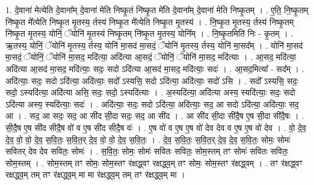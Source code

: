 \documentclass[17pt]{extarticle}
\begin{document}
1. दे॒वाना॑ मेत्येति दे॒वाना᳚म् दे॒वाना॑ मेति निष्कृ॒तं नि॑ष्कृ॒त मे॑ति दे॒वाना᳚म् दे॒वाना॑ मेति निष्कृ॒तम् । . ए॒ति॒ नि॒ष्कृ॒तम् नि॑ष्कृ॒त मे᳚त्येति निष्कृ॒त मृ॒तस्य॒ र्तस्य॑ निष्कृ॒त मे᳚त्येति निष्कृ॒त मृ॒तस्य॑ । . नि॒ष्कृ॒त मृ॒तस्य॒ र्तस्य॑ निष्कृ॒तम् नि॑ष्कृ॒त मृ॒तस्य॒ योनिं॒ ॅयोनि॑ मृ॒तस्य॑ निष्कृ॒तम् नि॑ष्कृ॒त मृ॒तस्य॒ योनि᳚म् । . नि॒ष्कृ॒तमिति॑ निः - कृ॒तम् । . ऋ॒तस्य॒ योनिं॒ ॅयोनि॑ मृ॒तस्य॒ र्तस्य॒ योनि॑ मा॒सद॑ मा॒सदं॒ ॅयोनि॑ मृ॒तस्य॒ र्तस्य॒ योनि॑ मा॒सद᳚म् । . योनि॑ मा॒सद॑ मा॒सदं॒ ॅयोनिं॒ ॅयोनि॑ मा॒सद॒ मदि॑त्या॒ अदि॑त्या आ॒सदं॒ ॅयोनिं॒ ॅयोनि॑ मा॒सद॒ मदि॑त्याः । . आ॒सद॒ मदि॑त्या॒ अदि॑त्या आ॒सद॑ मा॒सद॒ मदि॑त्याः॒ सदः॒ सदो ऽदि॑त्या आ॒सद॑ मा॒सद॒ मदि॑त्याः॒ सदः॑ । . आ॒सद॒मित्या᳚ - सद᳚म् । . अदि॑त्याः॒ सदः॒ सदो ऽदि॑त्या॒ अदि॑त्याः॒ सदो᳚ ऽस्यसि॒ सदो ऽदि॑त्या॒ अदि॑त्याः॒ सदो॑ ऽसि । . सदो᳚ ऽस्यसि॒ सदः॒ सदो॒ ऽस्यदि॑त्या॒ अदि॑त्या असि॒ सदः॒ सदो॒ ऽस्यदि॑त्याः । . अ॒स्यदि॑त्या॒ अदि॑त्या अस्य॒ स्यदि॑त्याः॒ सदः॒ सदो ऽदि॑त्या अस्य॒ स्यदि॑त्याः॒ सदः॑ । . अदि॑त्याः॒ सदः॒ सदो ऽदि॑त्या॒ अदि॑त्याः॒ सद॒ आ सदो ऽदि॑त्या॒ अदि॑त्याः॒ सद॒ आ । . सद॒ आ सदः॒ सद॒ आ सी॑द सी॒दा सदः॒ सद॒ आ सी॑द । . आ सी॑द सी॒दा सी॑दै॒ष ए॒ष सी॒दा सी॑दै॒षः । . सी॒दै॒ष ए॒ष सी॑द सीदै॒ष वो॑ व ए॒ष सी॑द सीदै॒ष वः॑ । . ए॒ष वो॑ व ए॒ष ए॒ष वो॑ देव देव व ए॒ष ए॒ष वो॑ देव । . वो॒ दे॒व॒ दे॒व॒ वो॒ वो॒ दे॒व॒ स॒वि॒तः॒ स॒वि॒त॒र् दे॒व॒ वो॒ वो॒ दे॒व॒ स॒वि॒तः॒ । . दे॒व॒ स॒वि॒तः॒ स॒वि॒त॒र् दे॒व॒ दे॒व॒ स॒वि॒तः॒ सोमः॒ सोमः॑ सवितर् देव देव सवितः॒ सोमः॑ । . स॒वि॒तः॒ सोमः॒ सोमः॑ सवितः सवितः॒ सोम॒स्तम् तꣳ सोमः॑ सवितः सवितः॒ सोम॒स्तम् । . सोम॒स्तम् तꣳ सोमः॒ सोम॒स्तꣳ र॑क्षद्ध्वꣳ रक्षद्ध्व॒म् तꣳ सोमः॒ सोम॒स्तꣳ र॑क्षद्ध्वम् । . तꣳ र॑क्षद्ध्वꣳ रक्षद्ध्व॒म् तम् तꣳ र॑क्षद्ध्व॒म् मा मा र॑क्षद्ध्व॒म् तम् तꣳ र॑क्षद्ध्व॒म् मा । \newline
\end{document}
